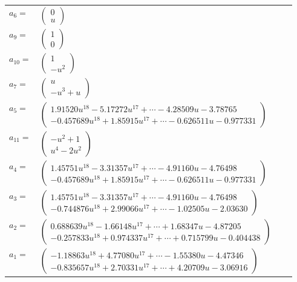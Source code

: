 \documentclass[1p]{elsarticle_modified}
\theoremstyle{definition}
\begin{document}
\begin{tabular}{m{7pt} m{180pt} m{7pt} m{180pt} }
\flushright $a_{6}=$&$\begin{pmatrix}0\\u\end{pmatrix}$ \\
\flushright $a_{9}=$&$\begin{pmatrix}1\\0\end{pmatrix}$ \\
\flushright $a_{10}=$&$\begin{pmatrix}1\\- u^2\end{pmatrix}$ \\
\flushright $a_{7}=$&$\begin{pmatrix}u\\- u^3+u\end{pmatrix}$ \\
\flushright $a_{5}=$&$\begin{pmatrix}1.91520 u^{18}-5.17272 u^{17}+\cdots-4.28509 u-3.78765\\-0.457689 u^{18}+1.85915 u^{17}+\cdots-0.626511 u-0.977331\end{pmatrix}$ \\
\flushright $a_{11}=$&$\begin{pmatrix}- u^2+1\\u^4-2 u^2\end{pmatrix}$ \\
\flushright $a_{4}=$&$\begin{pmatrix}1.45751 u^{18}-3.31357 u^{17}+\cdots-4.91160 u-4.76498\\-0.457689 u^{18}+1.85915 u^{17}+\cdots-0.626511 u-0.977331\end{pmatrix}$ \\
\flushright $a_{3}=$&$\begin{pmatrix}1.45751 u^{18}-3.31357 u^{17}+\cdots-4.91160 u-4.76498\\-0.744876 u^{18}+2.99066 u^{17}+\cdots-1.02505 u-2.03630\end{pmatrix}$ \\
\flushright $a_{2}=$&$\begin{pmatrix}0.688639 u^{18}-1.66148 u^{17}+\cdots+1.68347 u-4.87205\\-0.257833 u^{18}+0.974337 u^{17}+\cdots+0.715799 u-0.404438\end{pmatrix}$ \\
\flushright $a_{1}=$&$\begin{pmatrix}-1.18863 u^{18}+4.77080 u^{17}+\cdots-1.55380 u-4.47346\\-0.835657 u^{18}+2.70331 u^{17}+\cdots+4.20709 u-3.06916\end{pmatrix}$ \\

\end{tabular}
\end{document}
